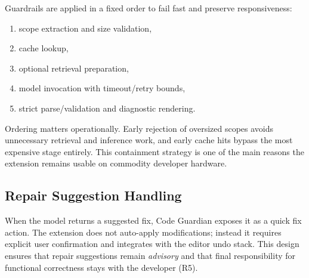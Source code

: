 Guardrails are applied in a fixed order to fail fast and preserve responsiveness:
\begin{enumerate}
  \item scope extraction and size validation,
  \item cache lookup,
  \item optional retrieval preparation,
  \item model invocation with timeout/retry bounds,
  \item strict parse/validation and diagnostic rendering.
\end{enumerate}

Ordering matters operationally. Early rejection of oversized scopes avoids unnecessary retrieval and inference work, and early cache hits bypass the most expensive stage entirely. This containment strategy is one of the main reasons the extension remains usable on commodity developer hardware.

\subsection{Repair Suggestion Handling}
\label{subsec:impl-repair}

When the model returns a suggested fix, Code Guardian exposes it as a quick fix action. The extension does not auto-apply modifications; instead it requires explicit user confirmation and integrates with the editor undo stack. This design ensures that repair suggestions remain \emph{advisory} and that final responsibility for functional correctness stays with the developer (R5).
